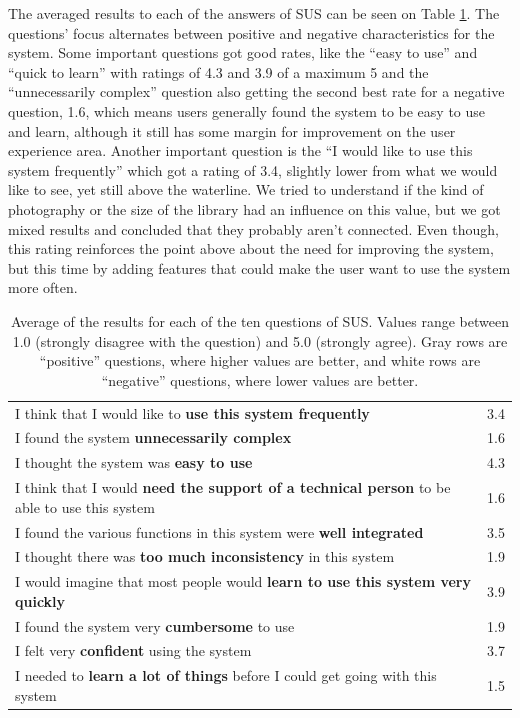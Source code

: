 {The averaged results to each of the answers of \ac{SUS} can be seen on Table \ref{tab:sus}. The questions' focus alternates between positive and negative characteristics for the system. Some important questions got good rates, like the ``easy to use'' and ``quick to learn'' with ratings of 4.3 and 3.9 of a maximum 5 and the ``unnecessarily complex'' question also getting the second best rate for a negative question, 1.6, which means users generally found the system to be easy to use and learn, although it still has some margin for improvement on the user experience area. Another important question is the ``I would like to use this system frequently'' which got a rating of 3.4, slightly lower from what we would like to see, yet still above the waterline. We tried to understand if the kind of photography or the size of the library had an influence on this value, but we got mixed results and concluded that they probably aren't connected. Even though, this rating reinforces the point above about the need for improving the system, but this time by adding features that could make the user want to use the system more often.

\vspace{\baselineskip}

\begin{table}[h!]
	\renewcommand{\arraystretch}{1.5}
	\centering
\begin{tabular}{l|c}
I think that I would like to \textbf{use this system frequently} & 3.4\\
I found the system \textbf{unnecessarily complex} & 1.6\\
I thought the system was \textbf{easy to use} & 4.3\\
I think that I would \textbf{need the support of a technical person} to be able to use this system & 1.6\\
I found the various functions in this system were \textbf{well integrated} & 3.5\\
I thought there was \textbf{too much inconsistency} in this system & 1.9\\
I would imagine that most people would \textbf{learn to use this system very quickly} & 3.9\\
I found the system very \textbf{cumbersome} to use & 1.9\\
I felt very \textbf{confident} using the system & 3.7\\
I needed to \textbf{learn a lot of things} before I could get going with this system & 1.5\\
\end{tabular}
\caption[Average of the results for each of the ten questions of \ac{SUS}.]{Average of the results for each of the ten questions of \ac{SUS}. Values range between 1.0 (strongly disagree with the question) and 5.0 (strongly agree). Gray rows are ``positive'' questions, where higher values are better, and white rows are ``negative'' questions, where lower values are better.}
\label{tab:sus}
\vspace{\baselineskip}
\end{table}





}
